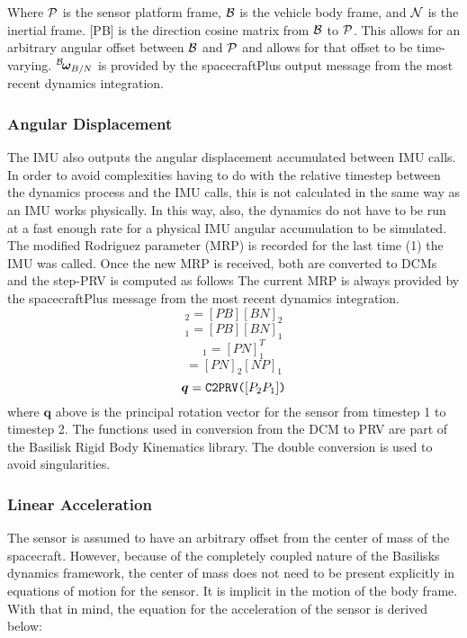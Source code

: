 Where $\cal{P}$ is the sensor platform frame, $\cal{B}$ is the vehicle body frame, and $\cal{N}$ is the inertial frame. [PB] is the direction cosine matrix from $\cal{B}$ to $\cal{P}$. This allows for an arbitrary angular offset between $\cal{B}$ and $\cal{P}$ and allows for that offset to be time-varying. $\leftexp{B}{\bm{\omega}_{B/N}}$ is provided by the spacecraftPlus output message from the most recent dynamics integration.

\subsubsection{Angular Displacement}
The IMU also outputs the angular displacement accumulated between IMU calls. In order to avoid complexities having to do with the relative timestep between the dynamics process and the IMU calls, this is not calculated in the same way as an IMU works physically. In this way, also, the dynamics do not have to be run at a fast enough rate for a physical IMU angular accumulation to be simulated. 
The modified Rodriguez parameter (MRP) is recorded for the last time (1) the IMU was called. Once the new MRP is received, both are converted to DCMs and the step-PRV is computed as follows The current MRP is always provided by the spacecraftPlus message from the most recent dynamics integration.
\begin{equation}
	[PN]_2 = [PB][BN]_2
\end{equation}
\begin{equation}
	[PN]_1 = [PB][BN]_1
\end{equation}
\begin{equation}
	[NP]_1 = [PN]_1^T
\end{equation}
\begin{equation}
	[P_2P_1] = [PN]_2[NP]_1
\end{equation}
\begin{equation}
\bm{q} = \verb|C2PRV(|[P_2P_1]\verb|)|
\end{equation}
where $\bm{q}$ above is the principal rotation vector for the sensor from timestep 1 to timestep 2. The functions used in conversion from the DCM to PRV are part of the Basilisk Rigid Body Kinematics library. The double conversion is used to avoid singularities.

\subsubsection{Linear Acceleration}
The sensor is assumed to have an arbitrary offset from the center of mass of the spacecraft. However, because of the completely coupled nature of the Basilisks dynamics framework, the center of mass does not need to be present explicitly in equations of motion for the sensor. It is implicit in the motion of the body frame. With that in mind, the equation for the acceleration of the sensor is derived below:

